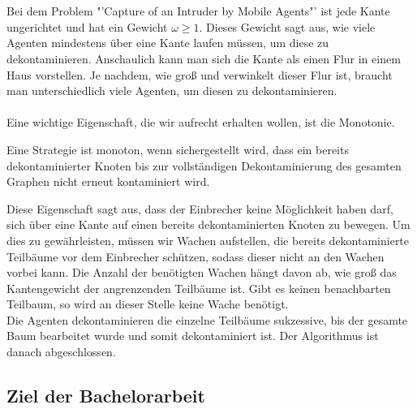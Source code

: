 \\
\\
Bei dem Problem "'Capture of an Intruder by Mobile Agents"' ist jede Kante ungerichtet und hat ein Gewicht $\omega \geq 1$. Dieses Gewicht sagt aus, wie viele Agenten mindestens über eine Kante laufen müssen, um diese zu dekontaminieren. Anschaulich kann man sich die Kante als einen Flur in einem Haus vorstellen. Je nachdem, wie groß und verwinkelt dieser Flur ist, braucht man unterschiedlich viele Agenten, um diesen  zu dekontaminieren.
\\
\\
Eine wichtige Eigenschaft, die wir aufrecht erhalten wollen, ist die Monotonie. 
\begin{mydef}\label{def_monotonie}
	Eine Strategie ist monoton, wenn sichergestellt wird, dass ein bereits dekontaminierter Knoten bis zur vollständigen Dekontaminierung des gesamten Graphen nicht erneut kontaminiert wird.
\end{mydef}
Diese Eigenschaft sagt aus, dass der Einbrecher keine Möglichkeit haben darf, sich über eine Kante auf einen bereits dekontaminierten Knoten zu bewegen. Um dies zu gewährleisten, müssen wir Wachen aufstellen, die bereits dekontaminierte Teilbäume vor dem Einbrecher schützen, sodass dieser nicht an den Wachen vorbei kann. Die Anzahl der benötigten Wachen hängt davon ab, wie groß das Kantengewicht der angrenzenden Teilbäume ist. Gibt es keinen benachbarten Teilbaum, so wird an dieser Stelle keine Wache benötigt.\\
Die Agenten dekontaminieren die einzelne Teilbäume sukzessive, bis der gesamte Baum bearbeitet wurde und somit dekontaminiert ist. Der Algorithmus ist danach abgeschlossen.

\subsection{Ziel der Bachelorarbeit}

